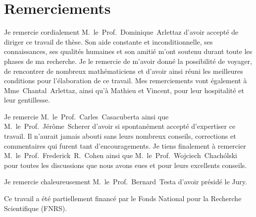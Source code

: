 
\chapter*{Remerciements}

Je remercie cordialement \hbox{M. le Prof. Dominique Arlettaz} d'avoir accept\'e de diriger ce travail de th\`ese. Son aide constante et inconditionnelle, ses connaissances, ses qualit\'es humaines et son amiti\'e m'ont soutenu durant toute les phases de ma recherche. Je le remercie de m'avoir donn\'e la possibilit\'e de voyager, de rencontrer de nombreux math\'ematiciens et d'avoir ainsi r\'euni les meilleures conditions pour l'\'elaboration de ce travail. Mes remerciements vont \'egalement \`a \hbox{Mme Chantal Arlettaz}, ainsi qu'\`a \hbox{Mathieu} et \hbox{Vincent}, pour leur hospitalit\'e et leur gentillesse. 

\medskip
Je remercie \hbox{M. le Prof. Carles Casacuberta} ainsi que \hbox{M. le Prof. J\'er\^ome Scherer} d'avoir si spontan\'ement accept\'e d'expertiser ce travail. Il n'aurait jamais abouti sans leurs nombreux conseils, corrections et commentaires qui furent tant d'encouragements. Je tiens finalement \`a remercier \hbox{M. le Prof. Frederick R. Cohen} ainsi que \hbox{M. le Prof. Wojciech Chach\'olski} pour toutes les discussions que nous avons eues et pour leurs excellents conseils.

\medskip
Je remercie chaleureusement \hbox{M. le Prof. Bernard Testa} d'avoir pr\'esid\'e le Jury.

\medskip
Ce travail a \'et\'e partiellement financ\'e par le Fonds National pour la Recherche Scientifique (FNRS).


